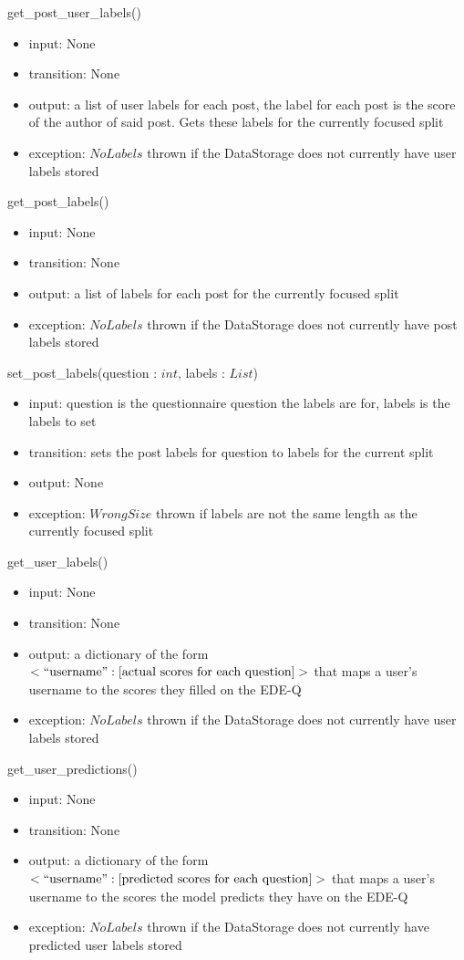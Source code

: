 \documentclass[12pt, titlepage]{article}
\begin{document}
\noindent get\_post\_user\_labels()
\begin{itemize}
\item input: None
\item transition: None
\item output: a list of user labels for each post, the label for each post is the score of the author of said post. Gets these labels for the currently focused split
\item exception: $NoLabels$ thrown if the DataStorage does not currently have user labels stored
\end{itemize}

\noindent get\_post\_labels()
\begin{itemize}
\item input: None
\item transition: None
\item output: a list of labels for each post for the currently focused split
\item exception: $NoLabels$ thrown if the DataStorage does not currently have post labels stored
\end{itemize}

\noindent set\_post\_labels(question : $int$, labels : $List$)
\begin{itemize}
\item input: question is the questionnaire question the labels are for, labels is the labels to set
\item transition: sets the post labels for question to labels for the current split
\item output: None
\item exception: $WrongSize$ thrown if labels are not the same length as the currently focused split
\end{itemize}

\noindent get\_user\_labels()
\begin{itemize}
\item input: None
\item transition: None
\item output: a dictionary of the form $<``\text{username}" : [\text{actual scores for each question}]>$ that maps a user's username to the scores they filled on the EDE-Q
\item exception: $NoLabels$ thrown if the DataStorage does not currently have user labels stored
\end{itemize}

\noindent get\_user\_predictions()
\begin{itemize}
\item input: None
\item transition: None
\item output: a dictionary of the form $<``\text{username}" : [\text{predicted scores for each question}]>$ that maps a user's username to the scores the model predicts they have on the EDE-Q
\item exception: $NoLabels$ thrown if the DataStorage does not currently have predicted user labels stored
\end{itemize}
\end{document}
